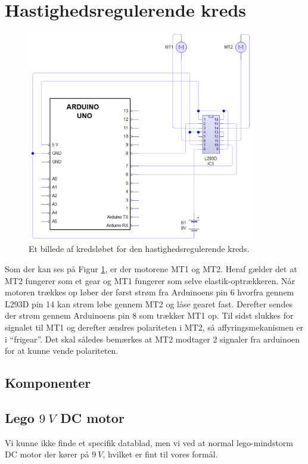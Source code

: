 \section{Hastighedsregulerende kreds}
\begin{figure}[H]	\label{kreds:hastighed}
	\centering
    \includegraphics[width=10cm]{figures/2_4kredse/hastighed.png}
	\caption{Et billede af kredsløbet for den hastighedsregulerende kreds.}
\end{figure}
Som der kan ses på Figur \ref{kreds:hastighed}, er der motorene MT1 og MT2. Heraf gælder det at MT2 fungerer som et gear og MT1 fungerer som selve elastik-optrækkeren. Når motoren trækkes op løber der først strøm fra Arduinoens pin 6 
 hvorfra gennem L293D pin 14 kan strøm løbe gennem MT2 og låse gearet fast. Derefter sendes der strøm gennem Arduinoens pin 8 som trækker MT1 op. 
Til sidst slukkes for signalet til MT1 og derefter ændres polariteten i MT2, så affyringsmekanismen er i ``frigear''. Det skal således bemærkes at MT2 modtager 2 signaler fra arduinoen for at kunne vende polariteten.

\subsection{Komponenter}
\subsection{Lego $\SI{9}{V}$ DC motor}
Vi kunne ikke finde et specifik datablad, men vi ved at normal lego-mindstorm DC motor der kører på $\SI{9}{V}$, hvilket er fint til vores formål. 
